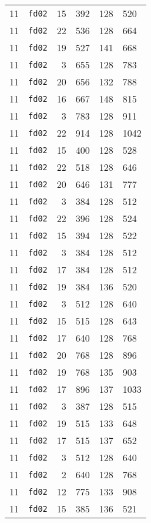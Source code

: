 \documentclass{article}
\begin{document}
\begin{table}[h!]
\begin{tabular}{llrrrl}
    11 & \texttt{fd02} & 15 & 392 & 128 & 520 \\
    11 & \texttt{fd02} & 22 & 536 & 128 & 664 \\
    11 & \texttt{fd02} & 19 & 527 & 141 & 668 \\
    11 & \texttt{fd02} & 3 & 655 & 128 & 783 \\
    11 & \texttt{fd02} & 20 & 656 & 132 & 788 \\
    11 & \texttt{fd02} & 16 & 667 & 148 & 815 \\
    11 & \texttt{fd02} & 3 & 783 & 128 & 911 \\
    11 & \texttt{fd02} & 22 & 914 & 128 & 1042 \\
    11 & \texttt{fd02} & 15 & 400 & 128 & 528 \\
    11 & \texttt{fd02} & 22 & 518 & 128 & 646 \\
    11 & \texttt{fd02} & 20 & 646 & 131 & 777 \\
    11 & \texttt{fd02} & 3 & 384 & 128 & 512 \\
    11 & \texttt{fd02} & 22 & 396 & 128 & 524 \\
    11 & \texttt{fd02} & 15 & 394 & 128 & 522 \\
    11 & \texttt{fd02} & 3 & 384 & 128 & 512 \\
    11 & \texttt{fd02} & 17 & 384 & 128 & 512 \\
    11 & \texttt{fd02} & 19 & 384 & 136 & 520 \\
    11 & \texttt{fd02} & 3 & 512 & 128 & 640 \\
    11 & \texttt{fd02} & 15 & 515 & 128 & 643 \\
    11 & \texttt{fd02} & 17 & 640 & 128 & 768 \\
    11 & \texttt{fd02} & 20 & 768 & 128 & 896 \\
    11 & \texttt{fd02} & 19 & 768 & 135 & 903 \\
    11 & \texttt{fd02} & 17 & 896 & 137 & 1033 \\
    11 & \texttt{fd02} & 3 & 387 & 128 & 515 \\
    11 & \texttt{fd02} & 19 & 515 & 133 & 648 \\
    11 & \texttt{fd02} & 17 & 515 & 137 & 652 \\
    11 & \texttt{fd02} & 3 & 512 & 128 & 640 \\
    11 & \texttt{fd02} & 2 & 640 & 128 & 768 \\
    11 & \texttt{fd02} & 12 & 775 & 133 & 908 \\
    11 & \texttt{fd02} & 15 & 385 & 136 & 521 \\

\end{tabular}
\end{table}
\end{document}
